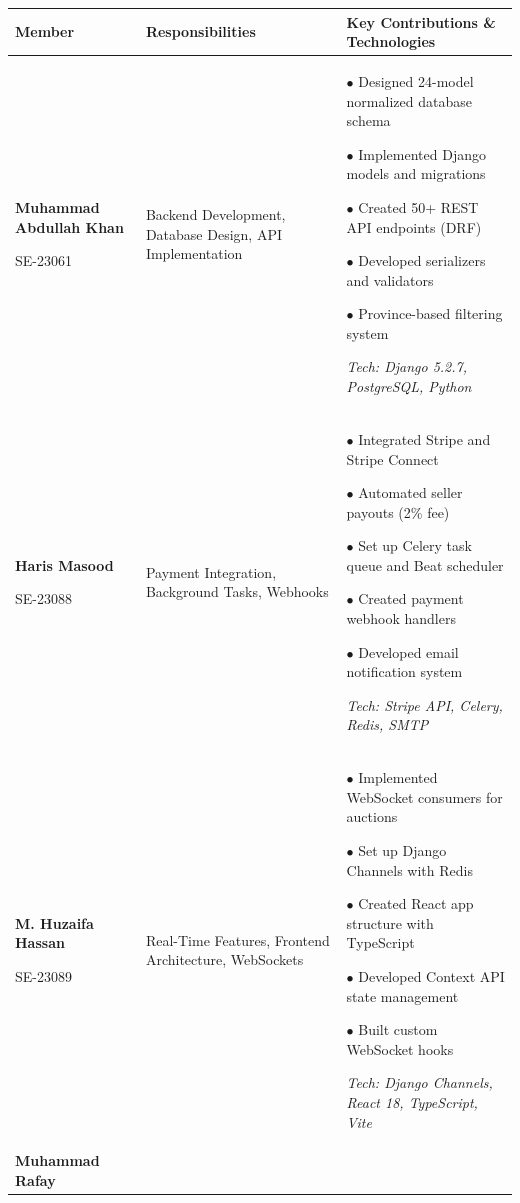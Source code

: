 \documentclass[12pt,a4paper]{article}
\begin{document}
\begin{table}[H]
\centering
\footnotesize
\begin{tabular}{|p{2.2cm}|p{4.5cm}|p{7cm}|}
\hline
\textbf{Member} & \textbf{Responsibilities} & \textbf{Key Contributions \& Technologies} \\
\hline
\textbf{Muhammad Abdullah Khan}

\vspace{0.1cm}
SE-23061 & 
Backend Development, Database Design, API Implementation &
$\bullet$ Designed 24-model normalized database schema

$\bullet$ Implemented Django models and migrations

$\bullet$ Created 50+ REST API endpoints (DRF)

$\bullet$ Developed serializers and validators

$\bullet$ Province-based filtering system

\vspace{0.1cm}
\textit{Tech: Django 5.2.7, PostgreSQL, Python} \\
\hline
\textbf{Haris Masood}

\vspace{0.1cm}
SE-23088 & 
Payment Integration, Background Tasks, Webhooks &
$\bullet$ Integrated Stripe and Stripe Connect

$\bullet$ Automated seller payouts (2\% fee)

$\bullet$ Set up Celery task queue and Beat scheduler

$\bullet$ Created payment webhook handlers

$\bullet$ Developed email notification system

\vspace{0.1cm}
\textit{Tech: Stripe API, Celery, Redis, SMTP} \\
\hline
\textbf{M. Huzaifa Hassan}

\vspace{0.1cm}
SE-23089 & 
Real-Time Features, Frontend Architecture, WebSockets &
$\bullet$ Implemented WebSocket consumers for auctions

$\bullet$ Set up Django Channels with Redis

$\bullet$ Created React app structure with TypeScript

$\bullet$ Developed Context API state management

$\bullet$ Built custom WebSocket hooks

\vspace{0.1cm}
\textit{Tech: Django Channels, React 18, TypeScript, Vite} \\
\hline
\textbf{Muhammad Rafay}


\end{tabular}
\end{table}
\end{document}
